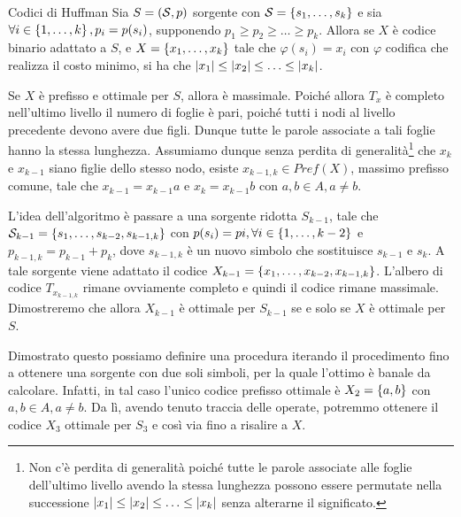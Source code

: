 \begin{algorithmdesc}{Codici di Huffman}
  Sia \(S = (\mathcal{S},p)\) sorgente con \(\SCal = \set{s_1, \ldots, s_k}\) e sia \(\forall i \in \set{1,\ldots,k}, p_i=p(s_i)\), supponendo \(p_1 \geq p_2 \geq \ldots \geq p_k\).
  Allora se \(X\) è codice binario adattato a \(S\), e \(X = \set{x_1,\ldots,x_k}\) tale che \(\varphi(s_i) = x_i\) con \(\varphi\) codifica che realizza il costo minimo, si ha che \(\left|x_1\right|\leq\left|x_2\right|\leq\ldots\leq\left|x_k\right|\).

  Se \(X\) è prefisso e ottimale per \(S\), allora è massimale. 
  Poiché allora \(T_x\) è completo nell'ultimo livello il numero di foglie è pari, poiché tutti i nodi al livello precedente devono avere due figli.
  Dunque tutte le parole associate a tali foglie hanno la stessa lunghezza.
  Assumiamo dunque senza perdita di generalità\footnote{Non c'è perdita di generalità poiché tutte le parole associate alle foglie dell'ultimo livello avendo la stessa lunghezza possono essere permutate nella successione \(\left|x_1\right|\leq\left|x_2\right|\leq\ldots\leq\left|x_k\right|\) senza alterarne il significato.} che \(x_k\) e \(x_{k-1}\) siano figlie dello stesso nodo, esiste \(x_{k-1,k}\in Pref(X)\), massimo prefisso comune, tale che \(x_{k-1} = x_{k-1}a\) e \(x_k = x_{k-1}b\) con \(a,b \in A, a \neq b\).

  L'idea dell'algoritmo è passare a una sorgente ridotta \(S_{k-1}\), tale che \(\SCal_{k-1} = \set{s_1,\ldots,s_{k-2}, s_{k-1,k}}\) con \(p(s_i)=pi, \forall i \in \set{1,\ldots,k-2}\) e \(p_{k-1,k} = p_{k-1} + p_k\), dove \(s_{k-1,k}\) è un nuovo simbolo che sostituisce \(s_{k-1}\) e \(s_k\).
  A tale sorgente viene adattato il codice \(X_{k-1} = \set{x_1,\ldots,x_{k-2}, x_{k-1,k}}\).
  L'albero di codice \(T_{x_{k-1,k}}\) rimane ovviamente completo e quindi il codice rimane massimale.
  Dimostreremo che allora \(X_{k-1}\) è ottimale per \(S_{k-1}\) se e solo se \(X\) è ottimale per \(S\).

  Dimostrato questo possiamo definire una procedura iterando il procedimento fino a ottenere una sorgente con due soli simboli, per la quale l'ottimo è banale da calcolare.
  Infatti, in tal caso l'unico codice prefisso ottimale è \(X_2 = \set{a,b}\) con \(a,b \in A, a \neq b\).
  Da lì, avendo tenuto traccia delle  operate, potremmo ottenere il codice \(X_3\) ottimale per \(S_3\) e così via fino a risalire a \(X\).
\end{algorithmdesc}

